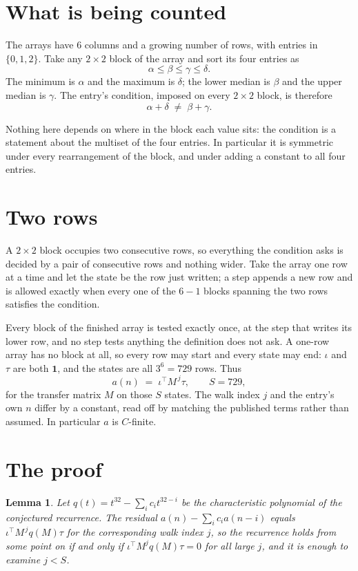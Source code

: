 \documentclass[11pt,a4paper]{article}
\theoremstyle{plain}
\newtheorem{lemma}[theorem]{Lemma}
\theoremstyle{definition}
\begin{document}
\section{What is being counted}

The arrays have $6$ columns and a growing number of rows, with entries in $\{0,1,2\}$. Take any
$2\times2$ block of the array and sort its four entries as
\[
\alpha\le\beta\le\gamma\le\delta .
\]
The minimum is $\alpha$ and the maximum is $\delta$; the lower median is $\beta$ and the upper
median is $\gamma$. The entry's condition, imposed on every $2\times2$ block, is therefore
\[
\alpha+\delta\;\neq\;\beta+\gamma .
\]

Nothing here depends on where in the block each value sits: the condition is a statement about
the multiset of the four entries. In particular it is symmetric under every rearrangement of
the block, and under adding a constant to all four entries.

\section{Two rows}

A $2\times2$ block occupies two consecutive rows, so everything the condition asks is decided
by a pair of consecutive rows and nothing wider. Take the array one row at a time and let the
state be the row just written; a step appends a new row and is allowed exactly when every one
of the $6-1$ blocks spanning the two rows satisfies the condition.

Every block of the finished array is tested exactly once, at the step that writes its lower
row, and no step tests anything the definition does not ask. A one-row array has no block at
all, so every row may start and every state may end: $\iota$ and $\tau$ are both
$\mathbf{1}$, and the states are all $3^{6}=729$ rows. Thus
\[
a(n)\;=\;\iota^{\!\top}M^{\,j}\tau ,\qquad S=729,
\]
for the transfer matrix $M$ on those $S$ states. The walk index $j$ and the entry's own $n$
differ by a constant, read off by matching the published terms rather than assumed. In
particular $a$ is $C$-finite.

\section{The proof}

\begin{lemma}\label{lem:crit}
Let $q(t)=t^{32}-\sum_i c_it^{32-i}$ be the characteristic polynomial of the
conjectured recurrence. The residual $a(n)-\sum_ic_ia(n-i)$ equals
$\iota^{\!\top}M^{\,j}q(M)\tau$ for the corresponding walk index $j$, so the recurrence
holds from some point on if and only if $\iota^{\!\top}M^{j}q(M)\tau=0$ for all large $j$,
and it is enough to examine $j<S$.
\end{lemma}
\end{document}
